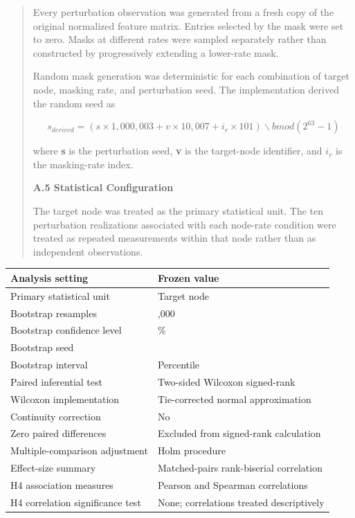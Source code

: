 \documentclass[a4paper]{article}
\newcounter{none} %
\begin{document}
\begin{quote}
Every perturbation observation was generated from a fresh copy of the
original normalized feature matrix. Entries selected by the mask were
set to zero. Masks at different rates were sampled separately rather
than constructed by progressively extending a lower-rate mask.

Random mask generation was deterministic for each combination of target
node, masking rate, and perturbation seed. The implementation derived
the random seed as

\[s_{derived} = \left( s \times 1,000,003 + v \times 10,007 + i_{r} \times 101 \right)\backslash bmod\left( 2^{63} - 1 \right)\]

where \textbf{s} is the perturbation seed, \textbf{v} is the target-node
identifier, and \textbf{\(i_r\)} is the masking-rate index.

\textbf{A.5 Statistical Configuration}

The target node was treated as the primary statistical unit. The ten
perturbation realizations associated with each node-rate condition were
treated as repeated measurements within that node rather than as
independent observations.
\end{quote}

{\def\LTcaptype{none} %
\begin{longtable}[]{@{}
  >{\raggedright\arraybackslash}p{}
  >{\raggedright\arraybackslash}p{}@{}}
\toprule\noalign{}
\begin{minipage}[b]{\linewidth}\raggedright
\textbf{Analysis setting}
\end{minipage} & \begin{minipage}[b]{\linewidth}\raggedright
\textbf{Frozen value}
\end{minipage} \\
\midrule\noalign{}
\endhead
\bottomrule\noalign{}
\endlastfoot
Primary statistical unit & Target node \\
Bootstrap resamples & 10,000 \\
Bootstrap confidence level & 95\% \\
Bootstrap seed & 20260917 \\
Bootstrap interval & Percentile \\
Paired inferential test & Two-sided Wilcoxon signed-rank \\
Wilcoxon implementation & Tie-corrected normal approximation \\
Continuity correction & No \\
Zero paired differences & Excluded from signed-rank calculation \\
Multiple-comparison adjustment & Holm procedure \\
Effect-size summary & Matched-pairs rank-biserial correlation \\
H4 association measures & Pearson and Spearman correlations \\
H4 correlation significance test & None; correlations treated
descriptively \\
\end{longtable}
}
\end{document}

